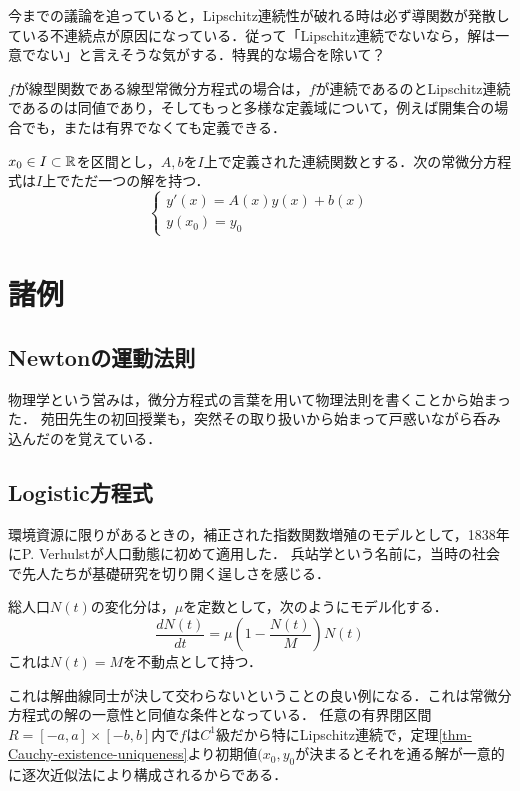 \documentclass[uplatex,dvipdfmx]{jsreport}
\begin{document}
\begin{remark}
    今までの議論を追っていると，Lipschitz連続性が破れる時は必ず導関数が発散している不連続点が原因になっている．従って「Lipschitz連続でないなら，解は一意でない」と言えそうな気がする．特異的な場合を除いて？
\end{remark}

$f$が線型関数である線型常微分方程式の場合は，$f$が連続であるのとLipschitz連続であるのは同値であり，そしてもっと多様な定義域について，例えば開集合の場合でも，または有界でなくても定義できる．
\begin{theorem}[線型常微分方程式の場合]\label{thm-linear-existence-and-uniqueness}
    $x_0\in I\subset\mathbb{R}$を区間とし，$A,b$を$I$上で定義された連続関数とする．次の常微分方程式は$I$上でただ一つの解を持つ．
    \[\begin{cases}
        y'(x) = A(x)y(x) + b(x)\\
        y(x_0) = y_0
    \end{cases}\]
\end{theorem}

\chapter{諸例}

\section{Newtonの運動法則}
物理学という営みは，微分方程式の言葉を用いて物理法則を書くことから始まった．
苑田先生の初回授業も，突然その取り扱いから始まって戸惑いながら呑み込んだのを覚えている．

\section{Logistic方程式}
環境資源に限りがあるときの，補正された指数関数増殖のモデルとして，1838年にP. Verhulstが人口動態に初めて適用した．
兵站学という名前に，当時の社会で先人たちが基礎研究を切り開く逞しさを感じる．

\begin{theory}
    総人口$N(t)$の変化分は，$\mu$を定数として，次のようにモデル化する．
    \[ \frac{dN(t)}{dt} = \mu\left(1-\frac{N(t)}{M}\right)N(t) \]
    これは$N(t)=M$を不動点として持つ．
\end{theory}
\begin{remark}
    これは解曲線同士が決して交わらないということの良い例になる．これは常微分方程式の解の一意性と同値な条件となっている．
    任意の有界閉区間$R=[-a,a]\times[-b,b]$内で$f$は$C^1$級だから特にLipschitz連続で，定理\ref{thm-Cauchy-existence-uniqueness}より初期値$(x_0,y_0$が決まるとそれを通る解が一意的に逐次近似法により構成されるからである．
\end{remark}
\end{document}
